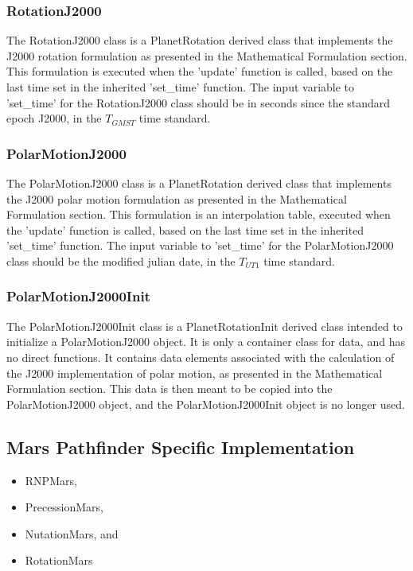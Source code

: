 \subsubsection{RotationJ2000}

The RotationJ2000 class is a PlanetRotation derived class that implements the
J2000 rotation formulation as presented in the Mathematical Formulation
section. This formulation is executed when the 'update' function is called,
based on the last time set in the inherited 'set\_time' function. The input
variable to 'set\_time' for the RotationJ2000 class should be in seconds
since the standard epoch J2000, in the $T_{GMST}$ time standard.

\subsubsection{PolarMotionJ2000}

The PolarMotionJ2000 class is a PlanetRotation derived class that implements
the J2000 polar motion formulation as presented in the Mathematical Formulation
section. This formulation is an interpolation table, executed when the
'update' function is called, based on the last time set in the inherited
'set\_time' function. The input variable to 'set\_time' for the
PolarMotionJ2000 class should be the modified julian date, in the
$T_{UT1}$ time standard.

\subsubsection{PolarMotionJ2000Init}

The PolarMotionJ2000Init class is a PlanetRotationInit derived class
intended to initialize a PolarMotionJ2000 object. It is only a container
class for data, and has no direct functions. It contains data
elements associated with the calculation of the J2000 implementation
of polar motion, as presented in the Mathematical Formulation section. 
This data
is then meant to be copied into the PolarMotionJ2000 object, and the
PolarMotionJ2000Init object is no longer used.

\subsection{Mars Pathfinder Specific Implementation}

\begin{itemize}
\item{RNPMars},
\item{PrecessionMars},
\item{NutationMars}, and
\item{RotationMars}
\end{itemize}

